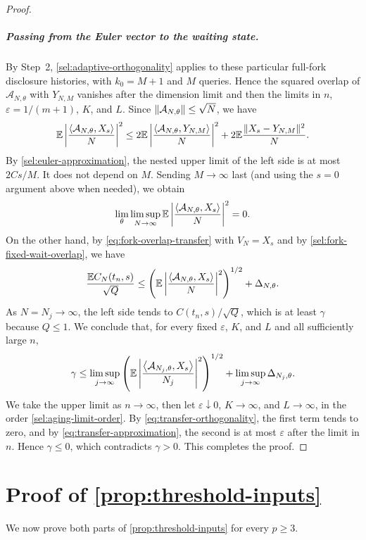 \begin{proof}
\subparagraph{Passing from the Euler vector to the waiting state.}
By Step~2, \cref{sel:adaptive-orthogonality} applies to these particular
full-fork disclosure histories, with $k_0=M+1$ and $M$ queries. Hence the
squared overlap of $\mathcal A_{N,\theta}$ with $Y_{N,M}$ vanishes after the
dimension limit and then the limits in $n$, $\varepsilon=1/(m+1)$, $K$, and $L$.
Since $\lVert\mathcal A_{N,\theta}\rVert\le\sqrt N$, we have
\[
 \mathbb E\left|\frac{\left\langle\mathcal A_{N,\theta},X_s\right\rangle}N\right|^2
 \le2\mathbb E\left|\frac{\left\langle\mathcal A_{N,\theta},Y_{N,M}\right\rangle}N\right|^2
 +2\mathbb E\frac{\lVert X_s-Y_{N,M}\rVert^2}N.
\]
By \eqref{sel:euler-approximation}, the nested upper limit of the left side
is at most $2Cs/M$. It does not depend on $M$. Sending $M\to\infty$ last
(and using the $s=0$ argument above when needed), we obtain
\begin{equation}\label{eq:transfer-orthogonality}
 \lim_\theta\limsup_{N\to\infty}
 \mathbb E\left|\frac{\left\langle\mathcal A_{N,\theta},X_s\right\rangle}N\right|^2=0.
\end{equation}
On the other hand, by \eqref{eq:fork-overlap-transfer} with $V_N=X_s$ and by
\eqref{sel:fork-fixed-wait-overlap}, we have
\[
 \frac{\mathbb E C_N(t_n,s)}{\sqrt Q}
 \le\left(\mathbb E\left|\frac{\left\langle\mathcal A_{N,\theta},X_s\right\rangle}N\right|^2\right)^{1/2}
 +\Delta_{N,\theta}.
\]
As $N=N_j\to\infty$, the left side tends to $C(t_n,s)/\sqrt Q$, which is at
least $\gamma$ because $Q\le1$. We conclude that, for every fixed
$\varepsilon$, $K$, and $L$ and all sufficiently large $n$,
\[
 \gamma\le\limsup_{j\to\infty}
 \left(\mathbb E\left|\frac{\left\langle\mathcal A_{N_j,\theta},X_s\right\rangle}{N_j}\right|^2\right)^{1/2}
 +\limsup_{j\to\infty}\Delta_{N_j,\theta}.
\]
We take the upper limit as $n\to\infty$, then let $\varepsilon\downarrow0$, $K\to\infty$, and $L\to\infty$, in the order \eqref{sel:aging-limit-order}.
By \eqref{eq:transfer-orthogonality}, the first term tends to zero, and by
\eqref{eq:transfer-approximation}, the second is at most $\varepsilon$ after
the limit in $n$. Hence $\gamma\le0$, which contradicts $\gamma>0$. This completes the proof.
\end{proof}

\section{Proof of \texorpdfstring{\cref{prop:threshold-inputs}}{the threshold inputs}}
\label{sec:general-proof-inputs}

We now prove both parts of \cref{prop:threshold-inputs} for every $p\ge3$.

